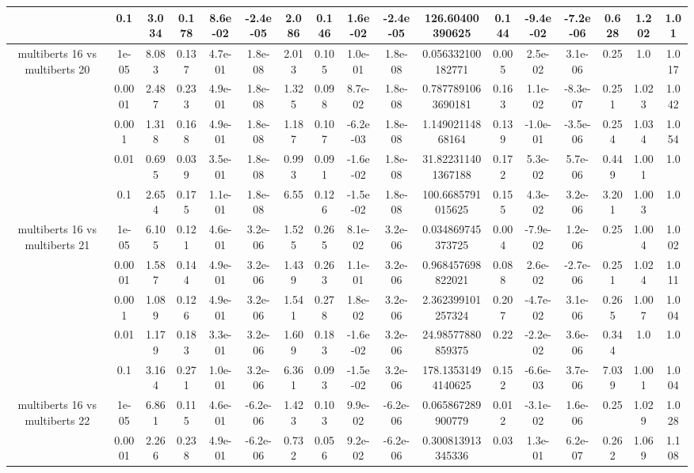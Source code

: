 \begin{tabular}{|c|c|c|c|c|c|c|c|c|c|c|c|c|c|c|c|c|}
 & 0.1 & 3.034 & 0.178 & 8.6e-02 & -2.4e-05 & 2.086 & 0.146 & 1.6e-02 & -2.4e-05 & 126.60400390625 & 0.144 & -9.4e-02 & -7.2e-06 & 0.628 & 1.202 & 1.01 \\
\hline
\multirow{5}{*}{multiberts 16 vs multiberts 20} & 1e-05 & 8.083 & 0.137 & 4.7e-01 & 1.8e-08 & 2.013 & 0.105 & 1.0e-01 & 1.8e-08 & 0.056332100182771 & 0.005 & 2.5e-02 & 3.1e-06 & 0.25 & 1.0 & 1.017 \\
 & 0.0001 & 2.487 & 0.233 & 4.9e-01 & 1.8e-08 & 1.325 & 0.098 & 8.7e-02 & 1.8e-08 & 0.7877891063690181 & 0.163 & 1.1e-02 & -8.3e-07 & 0.251 & 1.023 & 1.042 \\
 & 0.001 & 1.318 & 0.168 & 4.9e-01 & 1.8e-08 & 1.187 & 0.107 & -6.2e-03 & 1.8e-08 & 1.14902114868164 & 0.139 & -1.0e-01 & -3.5e-06 & 0.254 & 1.034 & 1.054 \\
 & 0.01 & 0.695 & 0.039 & 3.5e-01 & 1.8e-08 & 0.993 & 0.091 & -1.6e-02 & 1.8e-08 & 31.822311401367188 & 0.172 & 5.3e-02 & 5.7e-06 & 0.449 & 1.001 & 1.0 \\
 & 0.1 & 2.654 & 0.175 & 1.1e-01 & 1.8e-08 & 6.55 & 0.126 & -1.5e-02 & 1.8e-08 & 100.6685791015625 & 0.155 & 4.3e-02 & 3.2e-06 & 3.201 & 1.003 & 1.0 \\
\hline
\multirow{5}{*}{multiberts 16 vs multiberts 21} & 1e-05 & 6.105 & 0.121 & 4.6e-01 & 3.2e-06 & 1.525 & 0.265 & 8.1e-02 & 3.2e-06 & 0.034869745373725 & 0.004 & -7.9e-02 & 1.2e-06 & 0.25 & 1.004 & 1.002 \\
 & 0.0001 & 1.587 & 0.144 & 4.9e-01 & 3.2e-06 & 1.439 & 0.263 & 1.1e-01 & 3.2e-06 & 0.968457698822021 & 0.088 & 2.6e-02 & -2.7e-06 & 0.251 & 1.024 & 1.011 \\
 & 0.001 & 1.089 & 0.126 & 4.9e-01 & 3.2e-06 & 1.541 & 0.278 & 1.8e-02 & 3.2e-06 & 2.362399101257324 & 0.207 & -4.7e-02 & 3.1e-06 & 0.265 & 1.007 & 1.004 \\
 & 0.01 & 1.179 & 0.183 & 3.3e-01 & 3.2e-06 & 1.609 & 0.183 & -1.6e-02 & 3.2e-06 & 24.98577880859375 & 0.22 & -2.2e-02 & 3.6e-06 & 0.344 & 1.0 & 1.0 \\
 & 0.1 & 3.164 & 0.271 & 1.0e-01 & 3.2e-06 & 6.361 & 0.093 & -1.5e-02 & 3.2e-06 & 178.13531494140625 & 0.152 & -6.6e-03 & 3.7e-06 & 7.039 & 1.001 & 1.004 \\
\hline
\multirow{5}{*}{multiberts 16 vs multiberts 22} & 1e-05 & 6.861 & 0.115 & 4.6e-01 & -6.2e-06 & 1.423 & 0.103 & 9.9e-02 & -6.2e-06 & 0.065867289900779 & 0.012 & -3.1e-02 & 1.6e-06 & 0.25 & 1.029 & 1.028 \\
 & 0.0001 & 2.266 & 0.238 & 4.9e-01 & -6.2e-06 & 0.732 & 0.056 & 9.2e-02 & -6.2e-06 & 0.300813913345336 & 0.03 & 1.3e-01 & 6.2e-07 & 0.262 & 1.069 & 1.108 \\

\end{tabular}
